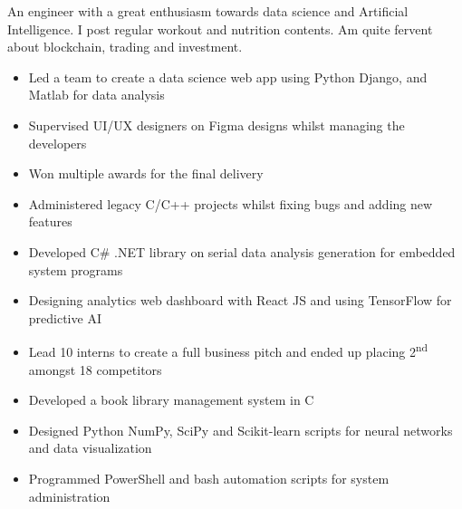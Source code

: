 \documentclass[11pt,a4paper,ragged2e]{altacv}
\begin{document}
\begin{paracol}{1}
\smallskip
{}

An engineer with a great enthusiasm towards data science and Artificial Intelligence. I post regular workout and nutrition contents. Am quite fervent about blockchain, trading and investment. \smallskip



\begin{itemize}
\item Led a team to create a data science web app using Python Django, and Matlab for data analysis
\item Supervised UI/UX designers on Figma designs whilst managing the developers
\item Won multiple awards for the final delivery
\end{itemize}
\tightdivider

\begin{itemize}
\item Administered legacy C/C++ projects whilst fixing bugs and adding new features
\item Developed C\# .NET library on serial data analysis generation for embedded system programs
\item Designing analytics web dashboard with React JS and using TensorFlow for predictive AI 
\item Lead 10 interns to create a full business pitch and ended up placing  2\textsuperscript{nd} amongst 18 competitors
\end{itemize}
\tightdivider



\begin{itemize}
\item Developed a book library management system in C 
\item Designed Python NumPy, SciPy and Scikit-learn scripts for neural networks and data visualization
\item Programmed PowerShell and bash automation scripts for system administration
\end{itemize}
\tightdivider


\end{paracol}
\end{document}
